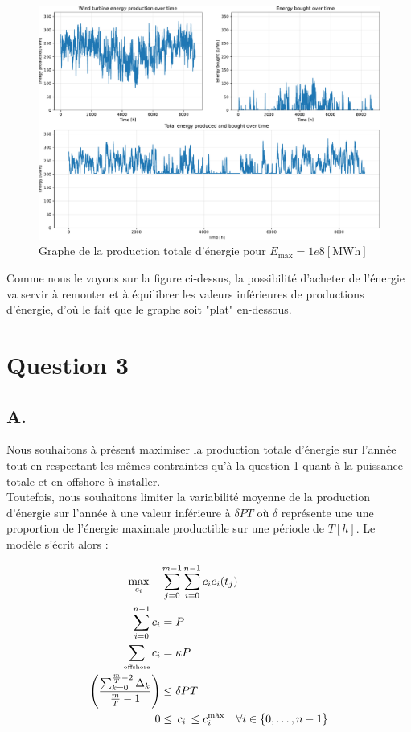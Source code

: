 \documentclass{article}
\begin{document}
\begin{figure}[ht!]
    \centering
    \includegraphics[scale=0.3]{Images/Partie_1/Q2/energy_produced_and_bought.pdf}
    \caption{Graphe de la production totale d'énergie pour $E_{\text{max}} = 1e8 [\mathrm{MWh}]$}
    \label{fig:total_energy_produced_and_bought_Q2}
\end{figure}
Comme nous le voyons sur la figure ci-dessus, la possibilité d'acheter de l'énergie va servir à remonter et à équilibrer les valeurs inférieures de productions d'énergie, d'où le fait que le graphe soit "plat" en-dessous.


\section*{Question 3}

\subsection*{A.}
Nous souhaitons à présent maximiser la production totale d'énergie sur l'année tout en respectant les mêmes contraintes qu'à la question 1 quant à la puissance totale et en offshore à installer.\\
Toutefois, nous souhaitons limiter la variabilité moyenne de la production d'énergie sur l'année à une valeur inférieure à $\delta P T$ où $\delta$ représente une une proportion de l'énergie maximale productible sur une période de $T [h]$. Le modèle s'écrit alors :

\begin{align*}
    \max_{c_i} \quad  
    &\sum_{j = 0}^{m-1} \sum_{i = 0}^{n-1} c_i e_i(t_j) \\ 
    \sum_{i=0}^{n-1} c_i &= P\\
    \sum_{\text{\tiny offshore}}c_i &= \kappa P\\
    \left( \frac{\sum_{k = 0}^{\frac{m}{T} - 2} \Delta_k }{\frac{m}{T} - 1}\right) &\leq \delta PT\\
    0 &\le \, c_i \, \le c_i^{\max} \quad \forall i \in \{0, \ldots, n-1\}
\end{align*}
\end{document}
